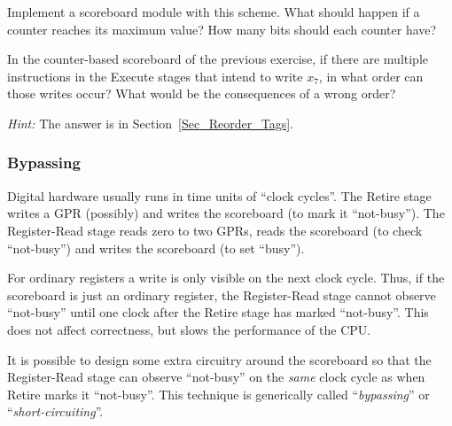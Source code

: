 \vspace{1ex}

Implement a scoreboard module with this scheme.  What should happen if
a counter reaches its maximum value?  How many bits should each
counter have?

\vspace{1ex}

\Exercise

In the counter-based scoreboard of the previous exercise, if there are
multiple instructions in the Execute stages that intend to write
$x_7$, in what order can those writes occur?  What would be the
consequences of a wrong order?

\emph{Hint:} The answer is in Section~\ref{Sec_Reorder_Tags}.

\Endexercise


\subsubsection{Bypassing}


Digital hardware usually runs in time units of ``clock cycles''.  The
Retire stage writes a GPR (possibly) and writes the scoreboard (to
mark it ``not-busy'').  The Register-Read stage reads zero to two
GPRs, reads the scoreboard (to check ``not-busy'') and writes the
scoreboard (to set ``busy'').

\vspace{1ex}

For ordinary registers a write is only visible on the next clock
cycle.  Thus, if the scoreboard is just an ordinary register, the
Register-Read stage cannot observe ``not-busy'' until one clock after
the Retire stage has marked ``not-busy''.  This does not affect
correctness, but slows the performance of the CPU.

\vspace{1ex}

It is possible to design some extra circuitry around the scoreboard so
that the Register-Read stage can observe ``not-busy'' on the
\emph{same} clock cycle as when Retire marks it ``not-busy''.  This
technique is generically called ``\emph{bypassing}'' or
``\emph{short-circuiting}''.

\hdivider

